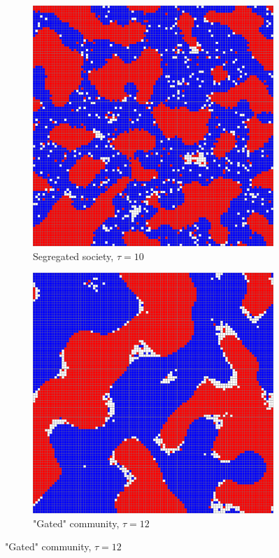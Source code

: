 \documentclass[../main.tex]{subfiles}
\begin{document}
\begin{figure}[H]
\begin{subfigure}{0.45\textwidth}
	\end{subfigure}	
	\begin{subfigure}{0.45\textwidth}	
	\centering
     \caption{Segregated society, $\tau = 10$}
	\includegraphics[width=\textwidth]{figs/schelling_10.pdf}	
	\end{subfigure}
    \begin{subfigure}{0.45\textwidth}	
	\centering
     \caption{"Gated" community, $\tau = 12$}
	\includegraphics[width=\textwidth]{figs/schelling_12.pdf}	
	\end{subfigure}
\end{figure}
\end{document}
